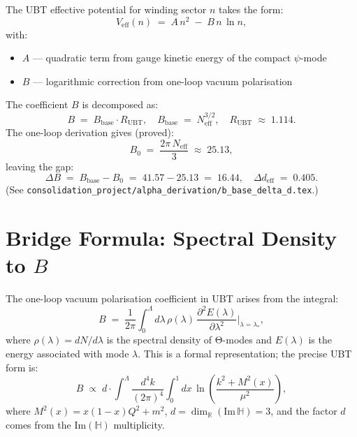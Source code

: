 \documentclass[11pt,a4paper]{article}
\theoremstyle{definition}
\theoremstyle{remark}
\begin{document}
The UBT effective potential for winding sector $n$ takes the form:
\begin{equation}
  V_{\mathrm{eff}}(n) \;=\; A\,n^2 \;-\; B\,n\,\ln n,
  \label{eq:Veff}
\end{equation}
with:
\begin{itemize}
  \item $A$ — quadratic term from gauge kinetic energy of the compact $\psi$-mode
  \item $B$ — logarithmic correction from one-loop vacuum polarisation
\end{itemize}
The coefficient $B$ is decomposed as:
\begin{equation}
  B \;=\; B_{\mathrm{base}} \cdot R_{\mathrm{UBT}},
  \quad
  B_{\mathrm{base}} \;=\; N_{\mathrm{eff}}^{3/2}, \quad
  R_{\mathrm{UBT}} \;\approx\; 1.114.
  \label{eq:B_decomp}
\end{equation}
The one-loop derivation gives (proved):
\begin{equation}
  B_0 \;=\; \frac{2\pi\,N_{\mathrm{eff}}}{3} \;\approx\; 25.13,
  \label{eq:B0_proved}
\end{equation}
leaving the gap:
\begin{equation}
  \Delta B \;=\; B_{\mathrm{base}} - B_0 \;=\; 41.57 - 25.13 \;=\; 16.44,
  \quad
  \Delta d_{\mathrm{eff}} \;=\; 0.405.
  \label{eq:gap}
\end{equation}
(See \texttt{consolidation\_project/alpha\_derivation/b\_base\_delta\_d.tex}.)

\section{Bridge Formula: Spectral Density to $B$}
\label{sec:bridge}

The one-loop vacuum polarisation coefficient in UBT arises from the integral:
\begin{equation}
  B \;=\; \frac{1}{2\pi}\int_0^{\Lambda} d\lambda\,\rho(\lambda)\,
    \frac{\partial^2 E(\lambda)}{\partial\lambda^2}\Bigg|_{\lambda=\lambda_*},
  \label{eq:B_spectral_formal}
\end{equation}
where $\rho(\lambda) = dN/d\lambda$ is the spectral density of Θ-modes
and $E(\lambda)$ is the energy associated with mode $\lambda$.
This is a formal representation; the precise UBT form is:
\begin{equation}
  B \;\propto\; d \cdot \int^\Lambda \frac{d^4k}{(2\pi)^4}
    \int_0^1 dx\, \ln\!\left(\frac{k^2 + M^2(x)}{\mu^2}\right),
  \label{eq:B_1loop}
\end{equation}
where $M^2(x) = x(1-x)Q^2 + m^2$, $d = \dim_\mathbb{R}(\mathrm{Im}\,\mathbb{H}) = 3$,
and the factor $d$ comes from the $\mathrm{Im}(\mathbb{H})$ multiplicity.
\end{document}

